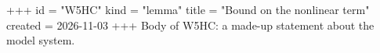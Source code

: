 +++
id = "W5HC"
kind = "lemma"
title = "Bound on the nonlinear term"
created = 2026-11-03
+++
Body of W5HC: a made-up statement about the model system.
